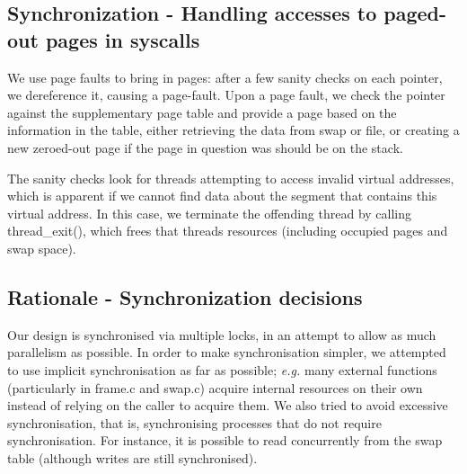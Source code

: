 \subsection{Synchronization - Handling accesses to paged-out pages in syscalls}

We use page faults to bring in pages: after a few sanity checks on each pointer, we dereference it, causing a page-fault.
Upon a page fault, we check the pointer against the supplementary page table and provide a page based on the information in the table, either retrieving the data from swap or file, or creating a new zeroed-out page if the page in question was should be on the stack.

The sanity checks look for threads attempting to access invalid virtual addresses, which is apparent if we cannot find data about the segment that contains this virtual address. In this case, we terminate the offending thread by calling thread\_exit(), which frees that threads resources (including occupied pages and swap space).

\subsection{Rationale - Synchronization decisions}

Our design is synchronised via multiple locks, in an attempt to allow as much parallelism as possible.
In order to make synchronisation simpler, we attempted to use implicit synchronisation as far as possible; \textit{e.g.} many external functions (particularly in frame.c and swap.c) acquire internal resources on their own instead of relying on the caller to acquire them.
We also tried to avoid excessive synchronisation, that is, synchronising processes that do not require synchronisation. For instance, it is possible to read concurrently from the swap table (although writes are still synchronised).